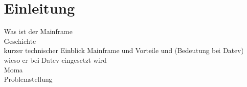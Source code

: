 \chapter{Einleitung}\label{ch:einleitung}

Was ist der Mainframe\\
Geschichte\\
kurzer technischer Einblick Mainframe und Vorteile und (Bedeutung bei Datev) \\
wieso er bei Datev eingesetzt wird \\
 Moma \\
 Problemstellung \\
